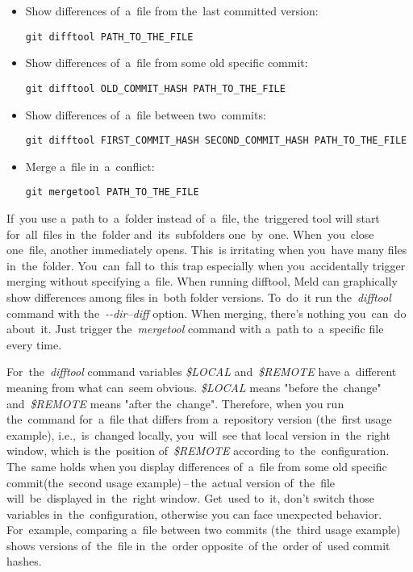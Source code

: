 \begin{itemize}
    \item Show differences of~a~file from the~last committed version:
        \begin{lstlisting}[frame=no, gobble=12]
            git difftool PATH_TO_THE_FILE
        \end{lstlisting}
    \item Show differences of~a~file from some old specific commit:
        \begin{lstlisting}[frame=no, gobble=12]
            git difftool OLD_COMMIT_HASH PATH_TO_THE_FILE
        \end{lstlisting}
    \item Show differences of~a~file between two~commits:
        \begin{lstlisting}[frame=no, gobble=12]
            git difftool FIRST_COMMIT_HASH SECOND_COMMIT_HASH PATH_TO_THE_FILE
        \end{lstlisting}
    \item Merge a~file in~a~conflict:
        \begin{lstlisting}[frame=no, gobble=12]
            git mergetool PATH_TO_THE_FILE
        \end{lstlisting}
\end{itemize}

\warningnonl If~you use a~path to~a~folder instead of~a~file, the~triggered tool will start for~all~files in~the~folder and~its~subfolders one~by~one. When~you~close one~file, another immediately opens. This~is irritating when you~have many files in~the~folder. You~can~fall to~this trap especially when you~accidentally trigger merging without specifying a~file. When running difftool, Meld can graphically show differences among files in~both folder versions. To~do~it run the~\textit{difftool} command with the~\textit{-{}-dir--diff} option. When merging, there's nothing you~can~do about~it. Just trigger the~\textit{mergetool} command with a~path to~a~specific file every time.

\warning For~the~\textit{difftool} command variables \textit{\$LOCAL} and~\textit{\$REMOTE} have a~different meaning from what can~seem obvious. \textit{\$LOCAL} means "before the~change" and~\textit{\$REMOTE} means "after the~change". Therefore, when you run the~command for~a~file that differs from a~repository version (the~first usage example), i.e.,~is~changed locally, you~will~see that local version in~the~right window, which is the~position of~\textit{\$REMOTE} according to~the~configuration. The~same holds when you display differences of~a~file from some old specific commit(the~second usage example)\,--\,the~actual version of~the~file will~be~displayed in~the~right window. Get~used to~it, don't switch those variables in~the~configuration, otherwise you can face unexpected behavior. For~example, comparing a~file between two commits (the~third usage example) shows versions of~the~file in~the~order opposite~of the~order of~used commit hashes.

